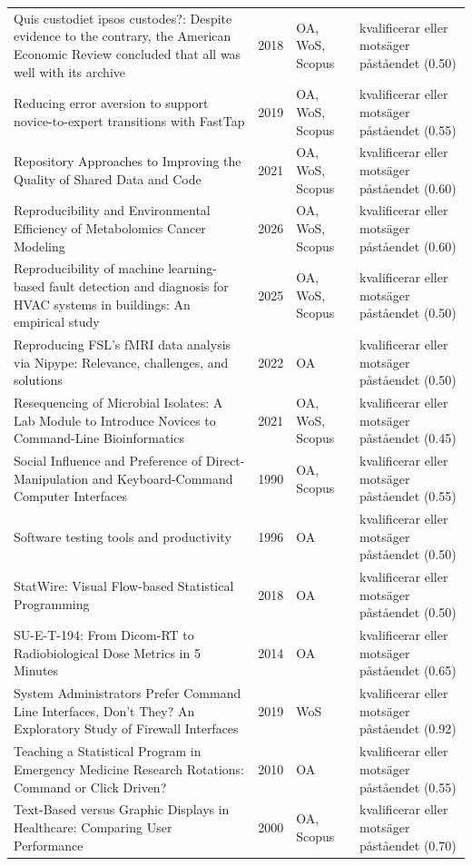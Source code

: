 \begin{longtable}{@{}%
  >{\raggedright\arraybackslash}p{}c%
  >{\raggedright\arraybackslash}p{}%
  >{\raggedright\arraybackslash}p{}@{}}
Quis custodiet ipsos custodes?: Despite evidence to the contrary, the American Economic Review concluded that all was well with its archive & 2018 & OA, WoS, Scopus & kvalificerar eller motsäger påståendet (0.50) \\
Reducing error aversion to support novice-to-expert transitions with FastTap & 2019 & OA, WoS, Scopus & kvalificerar eller motsäger påståendet (0.55) \\
Repository Approaches to Improving the Quality of Shared Data and Code & 2021 & OA, WoS, Scopus & kvalificerar eller motsäger påståendet (0.60) \\
Reproducibility and Environmental Efficiency of Metabolomics Cancer Modeling & 2026 & OA, WoS, Scopus & kvalificerar eller motsäger påståendet (0.60) \\
Reproducibility of machine learning-based fault detection and diagnosis for HVAC systems in buildings: An empirical study & 2025 & OA, WoS, Scopus & kvalificerar eller motsäger påståendet (0.50) \\
Reproducing FSL's fMRI data analysis via Nipype: Relevance, challenges, and solutions & 2022 & OA & kvalificerar eller motsäger påståendet (0.50) \\
Resequencing of Microbial Isolates: A Lab Module to Introduce Novices to Command-Line Bioinformatics & 2021 & OA, WoS, Scopus & kvalificerar eller motsäger påståendet (0.45) \\
Social Influence and Preference of Direct-Manipulation and Keyboard-Command Computer Interfaces & 1990 & OA, Scopus & kvalificerar eller motsäger påståendet (0.55) \\
Software testing tools and productivity & 1996 & OA & kvalificerar eller motsäger påståendet (0.50) \\
StatWire: Visual Flow-based Statistical Programming & 2018 & OA & kvalificerar eller motsäger påståendet (0.50) \\
SU-E-T-194: From Dicom-RT to Radiobiological Dose Metrics in 5 Minutes & 2014 & OA & kvalificerar eller motsäger påståendet (0.65) \\
System Administrators Prefer Command Line Interfaces, Don't They? An Exploratory Study of Firewall Interfaces & 2019 & WoS & kvalificerar eller motsäger påståendet (0.92) \\
Teaching a Statistical Program in Emergency Medicine Research Rotations: Command or Click Driven? & 2010 & OA & kvalificerar eller motsäger påståendet (0.55) \\
Text-Based versus Graphic Displays in Healthcare: Comparing User Performance & 2000 & OA, Scopus & kvalificerar eller motsäger påståendet (0.70) \\

\end{longtable}
